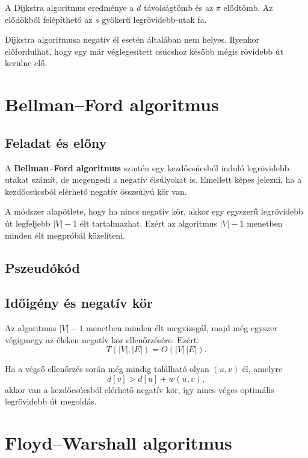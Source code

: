 A Dijkstra algoritmus eredménye a $d$ távolságtömb és az $\pi$ elődtömb. Az elődökből felépíthető az $s$ gyökerű legrövidebb-utak fa.

\begin{warningbox}
Dijkstra algoritmusa negatív él esetén általában nem helyes. Ilyenkor előfordulhat, hogy egy már véglegesített csúcshoz később mégis rövidebb út kerülne elő.
\end{warningbox}

\section{Bellman--Ford algoritmus}

\subsection{Feladat és előny}

A \textbf{Bellman--Ford algoritmus} szintén egy kezdőcsúcsból induló legrövidebb utakat számít, de megengedi a negatív élsúlyokat is. Emellett képes jelezni, ha a kezdőcsúcsból elérhető negatív összsúlyú kör van.

A módszer alapötlete, hogy ha nincs negatív kör, akkor egy egyszerű legrövidebb út legfeljebb $|V|-1$ élt tartalmazhat. Ezért az algoritmus $|V|-1$ menetben minden élt megpróbál közelíteni.

\subsection{Pszeudókód}


\subsection{Időigény és negatív kör}

Az algoritmus $|V|-1$ menetben minden élt megvizsgál, majd még egyszer végigmegy az éleken negatív kör ellenőrzésére. Ezért:
\[
T(|V|,|E|)=O(|V|\,|E|).
\]

Ha a végső ellenőrzés során még mindig található olyan $(u,v)$ él, amelyre
\[
d[v]>d[u]+w(u,v),
\]
akkor van a kezdőcsúcsból elérhető negatív kör, így nincs véges optimális legrövidebb út megoldás.

\section{Floyd--Warshall algoritmus}

